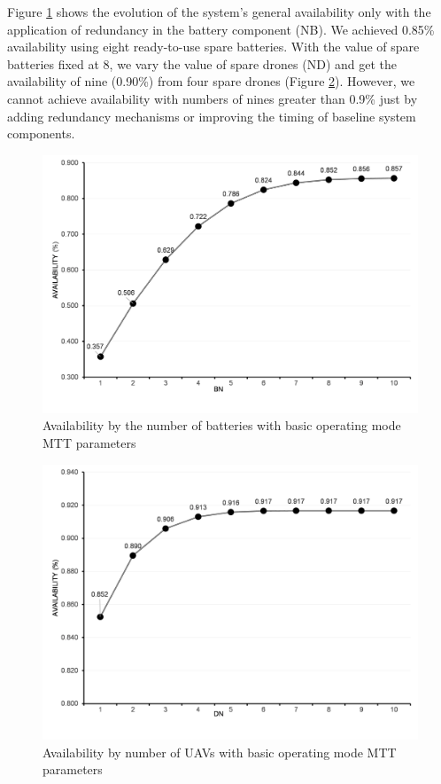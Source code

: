 \documentclass[conference]{IEEEtran}
\begin{document}
Figure \ref{fig:basic_spn_sa_battery} shows the evolution of the system's general availability only with the application of redundancy in the battery component (NB). We achieved 0.85\% availability using eight ready-to-use spare batteries. With the value of spare batteries fixed at 8, we vary the value of spare drones (ND) and get the availability of nine (0.90\%) from four spare drones (Figure \ref{fig:basic_spn_sa_uav}). However, we cannot achieve availability with numbers of nines greater than 0.9\% just by adding redundancy mechanisms or improving the timing of baseline system components.

\begin{figure}[htbp]
\centerline{\includegraphics[scale=0.45]{img/exps/SA_006.png}}
\caption{Availability by the number of batteries with basic operating mode MTT parameters}
\label{fig:basic_spn_sa_battery}
\end{figure}

\begin{figure}[htbp]
\centerline{\includegraphics[scale=0.45]{img/exps/SA_003.png}}
\caption{Availability by number of UAVs with basic operating mode MTT parameters}
\label{fig:basic_spn_sa_uav}
\end{figure}
\end{document}
